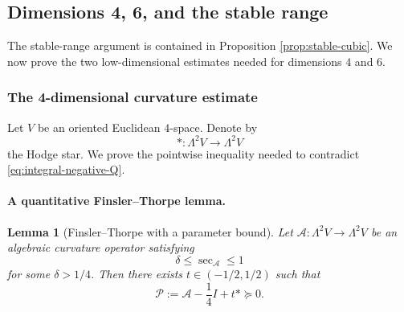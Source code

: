 \documentclass[reqno,11pt]{amsart}
\newtheorem{lemma}[theorem]{Lemma}
\theoremstyle{definition}
\newcommand{\cA}{\mathcal A}
\newcommand{\cP}{\mathcal P}
\begin{document}
\subsection{Dimensions 4, 6, and the stable range}\label{sec:dimension-estimates}

The stable-range argument is contained in Proposition \ref{prop:stable-cubic}. We now
prove the two low-dimensional estimates needed for dimensions $4$ and $6$.

\subsubsection{The 4-dimensional curvature estimate}\label{sec:curvature}

Let $V$ be an oriented Euclidean $4$-space. Denote by
$$
  *:\Lambda^2V\longrightarrow\Lambda^2V
$$
the Hodge star. We prove the pointwise inequality needed to contradict
\eqref{eq:integral-negative-Q}.

\paragraph{A quantitative Finsler--Thorpe lemma.}

\begin{lemma}[Finsler--Thorpe with a parameter bound]\label{lem:FT}
Let $\cA:\Lambda^2V\to\Lambda^2V$ be an algebraic curvature operator
satisfying
$$
  \delta\leq\sec_{\cA}\leq1
$$
for some $\delta>1/4$. Then there exists $t\in(-1/2,1/2)$ such that
\begin{equation}\label{eq:FTpositive}
  \cP:=\cA-\frac14I+t*\succeq0.
\end{equation}
\end{lemma}
\end{document}
